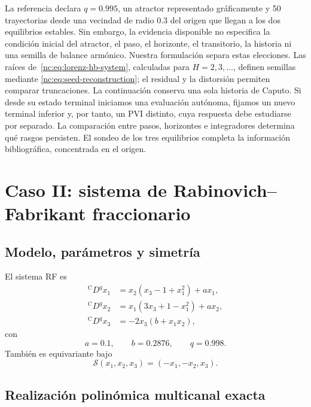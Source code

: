 La referencia declara \(q=0.995\), un atractor representado gráficamente y 50
trayectorias desde una vecindad de radio \(0.3\) del origen que llegan a los dos
equilibrios estables. Sin embargo, la evidencia disponible no especifica la
condición inicial del atractor, el paso, el horizonte, el transitorio, la
historia ni una semilla de balance armónico. Nuestra formulación separa
estas elecciones. Las raíces de~\eqref{nc:eq:lorenz-hb-system}, calculadas
para \(H=2,3,\ldots\), definen semillas mediante
\eqref{nc:eq:seed-reconstruction}; el residual y la distorsión permiten
comparar truncaciones. La continuación conserva una sola historia de Caputo.
Si desde su estado terminal iniciamos una evaluación autónoma, fijamos un
nuevo terminal inferior y, por tanto, un PVI distinto, cuya respuesta debe
estudiarse por separado. La comparación entre pasos, horizontes e integradores
determina qué rasgos persisten. El sondeo de los tres equilibrios completa
la información bibliográfica, concentrada en el origen.

\clearpage
\section[Caso II: Rabinovich--Fabrikant fraccionario]
{Caso II: sistema de Rabinovich--Fabrikant fraccionario}

\subsection{Modelo, parámetros y simetría}

El sistema RF es
\begin{equation}
\begin{aligned}
 {}^{\mathrm C}D^qx_1&=x_2(x_3-1+x_1^2)+a x_1,\\
 {}^{\mathrm C}D^qx_2&=x_1(3x_3+1-x_1^2)+a x_2,\\
 {}^{\mathrm C}D^qx_3&=-2x_3(b+x_1x_2),
\end{aligned}
\label{nc:eq:rf-model}
\end{equation}
con
\begin{equation}
 a=0.1,\qquad b=0.2876,\qquad q=0.998.
 \label{nc:eq:rf-parameters}
\end{equation}
También es equivariante bajo
\begin{equation}
 \mathcal S(x_1,x_2,x_3)=(-x_1,-x_2,x_3).
\end{equation}

\subsection{Realización polinómica multicanal exacta}

